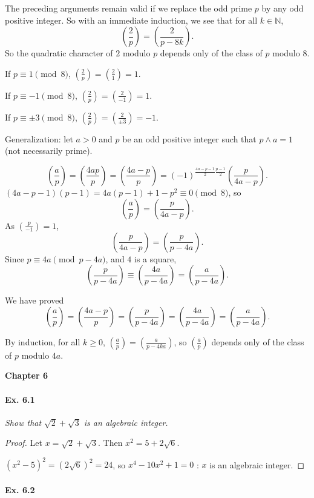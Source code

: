 \documentclass[11pt,a4paper]{article}
\newcommand{\N}{\mathbb{N}}
\newcommand{\legendre}[2]{\genfrac{(}{)}{}{}{#1}{#2}}
\begin{document}
The preceding arguments remain valid if we replace the odd prime $p$ by any odd positive integer.  So with an immediate induction, we see that for all $k \in \N$,
$$ \legendre{2}{p} = \legendre{2}{p-8k}.$$
So the quadratic character of $2$ modulo $p$ depends only of the class of $p$ modulo $8$.

If $p \equiv 1 \pmod 8$, $\legendre{2}{p} =\legendre{2}{1} = 1$.

If $p \equiv -1 \pmod 8$, $\legendre{2}{p} =\legendre{2}{-1} = 1$.

If $p \equiv \pm 3 \pmod 8$, $\legendre{2}{p} =\legendre{2}{\pm 3} = -1$.

\bigskip

Generalization: let $a>0$ and $p$ be an odd positive integer such that $p \wedge a =1$ (not necessarily prime).

$$\legendre{a}{p} = \legendre{4a p}{p} = \legendre{4a-p}{p} = (-1)^{\frac{4a - p -1}{2} \frac{p-1}{2}} \legendre{p}{4a-p}.$$
$(4a-p-1)(p-1)=  4a(p-1)  + 1 - p^2 \equiv 0 \pmod 8$, so 
$$\legendre{a}{p} =  \legendre{p}{4a-p}.$$
As $\legendre{p}{-1} = 1$,
$$  \legendre{p}{4a-p} =   \legendre{p}{p-4a}.$$
Since $p \equiv 4a \pmod {p-4a}$,  and $4$ is a square,
$$\legendre{p}{p-4a} \equiv \legendre{4a}{p-4a} =  \legendre{a}{p-4a}.$$

We have proved
$$\legendre{a}{p} = \legendre{4a-p}{p} =  \legendre{p}{p-4a} = \legendre{4a}{p-4a}  =  \legendre{a}{p-4a}.$$

By induction, for all $k\geq 0$, $\legendre{a}{p} = \legendre{a}{p-4ka}$, so $\legendre{a}{p}$ depends only of the class of $p$ modulo $4a$.

\newpage

{ \Large \bf Chapter 6} 

\paragraph{Ex. 6.1}

{\it Show that $\sqrt{2} + \sqrt{3}$ is an algebraic integer.
}

\begin{proof}
Let $x = \sqrt{2}+\sqrt{3}$. Then $x^2 = 5 + 2\sqrt{6}$.

$(x^2-5)^2 = (2 \sqrt{6})^2 = 24$, so $x^4 - 10 x^2 + 1 = 0$ :  $x$ is an algebraic integer.
\end{proof}

\paragraph{Ex. 6.2}
\end{document}
